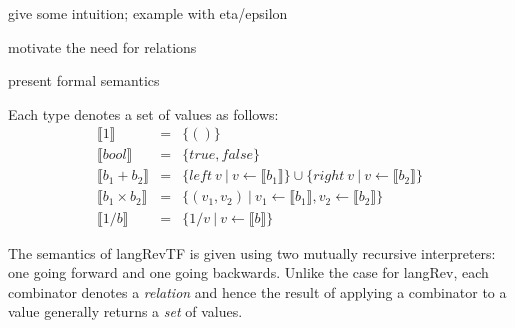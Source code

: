 \documentclass{llncs}
\begin{document}
give some intuition; example with eta/epsilon

motivate the need for relations

present formal semantics

\begin{definition}
\label{chx:def:denot}
Each type denotes a set of values as follows:
\[\begin{array}{rcl}
\llbracket 1 \rrbracket &=& \{ () \} \\
\llbracket \mathit{bool} \rrbracket &=& \{ \mathit{true}, \mathit{false} \} \\
\llbracket b_1 + b_2 \rrbracket &=& \{ \mathit{left}~v ~|~ v \leftarrow \llbracket b_1 \rrbracket \}
           \cup \{ \mathit{right}~v ~|~ v \leftarrow \llbracket b_2 \rrbracket \} \\
\llbracket b_1 \times b_2 \rrbracket &=& \{ (v_1,v_2) ~|~ v_1 \leftarrow \llbracket b_1 \rrbracket, 
           v_2 \leftarrow \llbracket b_2 \rrbracket \} \\
\llbracket 1/b \rrbracket &=& \{ 1/v ~|~ v \leftarrow \llbracket b \rrbracket \} 
\end{array}\]
\end{definition}

The semantics of {{langRevTF}} is given using two mutually recursive
interpreters: one going forward and one going backwards. Unlike the case for
{{langRev}}, each combinator denotes a \emph{relation} and hence the result
of applying a combinator to a value generally returns a \emph{set} of
values. 
\end{document}
